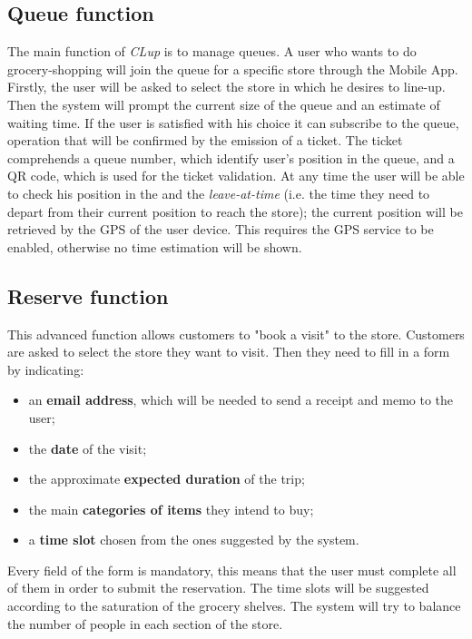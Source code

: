 \subsection{Queue function}
The main function of \textit{CLup} is to manage queues. A user who wants to do grocery-shopping will join the queue for a specific store through the Mobile App.\newline
Firstly, the user will be asked to select the store in which he desires to line-up.\newline
Then the system will prompt the current size of the queue and an estimate of waiting time. If the user is satisfied with his choice it can subscribe to the queue, operation that will be confirmed by the emission of a ticket. The ticket comprehends a queue number, which identify user's position in the queue, and a QR code, which is used for the ticket validation. At any time the user will be able to check his position in the and the \textit{leave-at-time} (i.e. the time they need to depart from their current position to reach the store); the current position will be retrieved by the GPS of the user device. This requires the GPS service to be enabled, otherwise no time estimation will be shown.

\subsection{Reserve function}
This advanced function allows customers to "book a visit" to the store. Customers are asked to select the store they want to visit. Then they need to fill in a form by indicating:
\begin{itemize}
	\item an \textbf{email address}, which will be needed to send a receipt and memo to the user;
	\item the \textbf{date} of the visit;
	\item the approximate \textbf{expected duration} of the trip;
 	\item the main \textbf{categories of items} they intend to buy;
    \item a \textbf{time slot} chosen from the ones suggested by the system.
\end{itemize}
Every field of the form is mandatory, this means that the user must complete all of them in order to submit the reservation. The time slots will be suggested according to the saturation of the grocery shelves. The system will try to balance the number of people in each section of the store.

